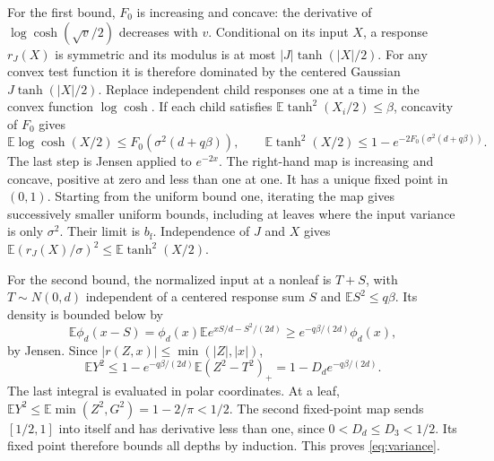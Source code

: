\documentclass[11pt]{article}
\theoremstyle{definition}
\theoremstyle{remark}
\newcommand{\E}{\mathbb E}
\begin{document}
For the first bound, $F_0$ is increasing and concave: the derivative of
$\log\cosh(\sqrt v/2)$ decreases with $v$. Conditional on its input $X$,
a response $r_J(X)$ is symmetric and its modulus is at most
$|J|\tanh(|X|/2)$. For any convex test function it is therefore dominated
by the centered Gaussian $J\tanh(|X|/2)$. Replace independent child
responses one at a time in the convex function $\log\cosh$. If each child
satisfies $\E\tanh^2(X_i/2)\le\beta$, concavity of $F_0$ gives
\[
 \E\log\cosh(X/2)\le F_0(\sigma^2(d+q\beta)),\qquad
 \E\tanh^2(X/2)\le1-e^{-2F_0(\sigma^2(d+q\beta))}.
\]
The last step is Jensen applied to $e^{-2x}$. The right-hand map is
increasing and concave, positive at zero and less than one at one. It
has a unique fixed point in $(0,1)$. Starting from the uniform bound one,
iterating the map gives successively smaller uniform bounds, including at
leaves where the input variance is only $\sigma^2$. Their limit is
$b_{\mathrm f}$. Independence of $J$ and $X$ gives
$\E(r_J(X)/\sigma)^2\le\E\tanh^2(X/2)$.

For the second bound, the normalized input at a nonleaf is $T+S$, with
$T\sim N(0,d)$ independent of a centered response sum $S$ and
$\E S^2\le q\beta$. Its density is bounded below by
\[
 \E\phi_d(x-S)=\phi_d(x)\E e^{xS/d-S^2/(2d)}
                    \ge e^{-q\beta/(2d)}\phi_d(x),
\]
by Jensen. Since $|r(Z,x)|\le\min(|Z|,|x|)$,
\[
 \E Y^2\le1-e^{-q\beta/(2d)}\E(Z^2-T^2)_+
             =1-D_d e^{-q\beta/(2d)}.
\]
The last integral is evaluated in polar coordinates. At a leaf,
$\E Y^2\le\E\min(Z^2,G^2)=1-2/\pi<1/2$.
The second fixed-point map sends $[1/2,1]$ into itself and has derivative
less than one, since $0<D_d\le D_3<1/2$. Its fixed point therefore bounds
all depths by induction. This proves \eqref{eq:variance}.
\end{document}
